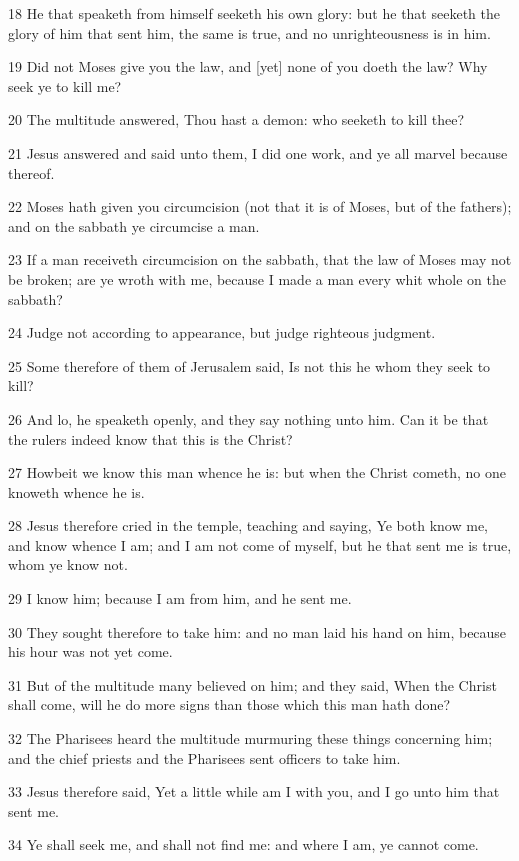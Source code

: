 \par 18 He that speaketh from himself seeketh his own glory: but he that seeketh the glory of him that sent him, the same is true, and no unrighteousness is in him.
\par 19 Did not Moses give you the law, and [yet] none of you doeth the law? Why seek ye to kill me?
\par 20 The multitude answered, Thou hast a demon: who seeketh to kill thee?
\par 21 Jesus answered and said unto them, I did one work, and ye all marvel because thereof.
\par 22 Moses hath given you circumcision (not that it is of Moses, but of the fathers); and on the sabbath ye circumcise a man.
\par 23 If a man receiveth circumcision on the sabbath, that the law of Moses may not be broken; are ye wroth with me, because I made a man every whit whole on the sabbath?
\par 24 Judge not according to appearance, but judge righteous judgment.
\par 25 Some therefore of them of Jerusalem said, Is not this he whom they seek to kill?
\par 26 And lo, he speaketh openly, and they say nothing unto him. Can it be that the rulers indeed know that this is the Christ?
\par 27 Howbeit we know this man whence he is: but when the Christ cometh, no one knoweth whence he is.
\par 28 Jesus therefore cried in the temple, teaching and saying, Ye both know me, and know whence I am; and I am not come of myself, but he that sent me is true, whom ye know not.
\par 29 I know him; because I am from him, and he sent me.
\par 30 They sought therefore to take him: and no man laid his hand on him, because his hour was not yet come.
\par 31 But of the multitude many believed on him; and they said, When the Christ shall come, will he do more signs than those which this man hath done?
\par 32 The Pharisees heard the multitude murmuring these things concerning him; and the chief priests and the Pharisees sent officers to take him.
\par 33 Jesus therefore said, Yet a little while am I with you, and I go unto him that sent me.
\par 34 Ye shall seek me, and shall not find me: and where I am, ye cannot come.
